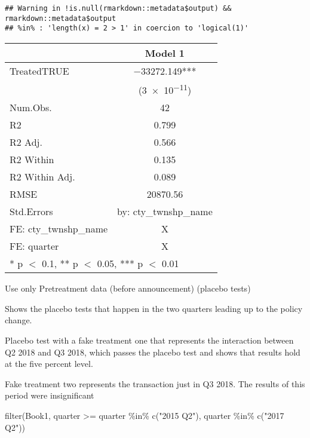 \documentclass[
]{article}
\newenvironment{Shaded}{\begin{snugshade}}{\end{snugshade}}
\newcommand{\FunctionTok}[1]{\textcolor[rgb]{0.00,0.00,0.00}{#1}}
\newcommand{\NormalTok}[1]{#1}
\newcommand{\SpecialCharTok}[1]{\textcolor[rgb]{0.00,0.00,0.00}{#1}}
\newcommand{\StringTok}[1]{\textcolor[rgb]{0.31,0.60,0.02}{#1}}
\begin{document}
\begin{verbatim}
## Warning in !is.null(rmarkdown::metadata$output) && rmarkdown::metadata$output
## %in% : 'length(x) = 2 > 1' in coercion to 'logical(1)'
\end{verbatim}

\begin{table}
\centering
\begin{tabular}[t]{lc}
\toprule
  & Model 1\\
\midrule
TreatedTRUE & \num{-33272.149}***\\
 & (\num{3e-11})\\
\midrule
Num.Obs. & \num{42}\\
R2 & \num{0.799}\\
R2 Adj. & \num{0.566}\\
R2 Within & \num{0.135}\\
R2 Within Adj. & \num{0.089}\\
RMSE & \num{20870.56}\\
Std.Errors & by: cty\_twnshp\_name\\
FE: cty\_twnshp\_name & X\\
FE: quarter & X\\
\bottomrule
\multicolumn{2}{l}{\rule{0pt}{1em}* p $<$ 0.1, ** p $<$ 0.05, *** p $<$ 0.01}\\
\end{tabular}
\end{table}

Use only Pretreatment data (before announcement) (placebo tests)

Shows the placebo tests that happen in the two quarters leading up to
the policy change.

Placebo test with a fake treatment one that represents the interaction
between Q2 2018 and Q3 2018, which passes the placebo test and shows
that results hold at the five percent level.

Fake treatment two represents the transaction just in Q3 2018. The
results of this period were insignificant

\begin{Shaded}
\begin{Highlighting}[]
\FunctionTok{filter}\NormalTok{(Book1, quarter }\SpecialCharTok{\textgreater{}=}\NormalTok{ quarter }\SpecialCharTok{\%in\%} \FunctionTok{c}\NormalTok{(}\StringTok{"2015 Q2"}\NormalTok{), quarter }\SpecialCharTok{\%in\%} \FunctionTok{c}\NormalTok{(}\StringTok{"2017 Q2"}\NormalTok{))}
\end{Highlighting}
\end{Shaded}
\end{document}
